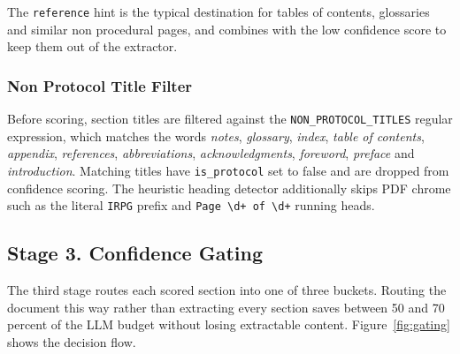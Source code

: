 \documentclass{article}
\begin{document}
The \texttt{reference} hint is the typical destination for tables of
contents, glossaries and similar non procedural pages, and combines
with the low confidence score to keep them out of the extractor.

\subsubsection{Non Protocol Title Filter}

Before scoring, section titles are filtered against the
\texttt{NON\_PROTOCOL\_TITLES} regular expression, which matches the
words \emph{notes}, \emph{glossary}, \emph{index},
\emph{table of contents}, \emph{appendix}, \emph{references},
\emph{abbreviations}, \emph{acknowledgments}, \emph{foreword},
\emph{preface} and \emph{introduction}. Matching titles have
\texttt{is\_protocol} set to false and are dropped from confidence
scoring. The heuristic heading detector additionally skips PDF chrome
such as the literal \texttt{IRPG} prefix and
\texttt{Page \textbackslash d+ of \textbackslash d+} running heads.

\subsection{Stage 3. Confidence Gating}

The third stage routes each scored section into one of three buckets.
Routing the document this way rather than extracting every section
saves between 50 and 70 percent of the LLM budget without losing
extractable content. Figure~\ref{fig:gating} shows the decision flow.
\end{document}
